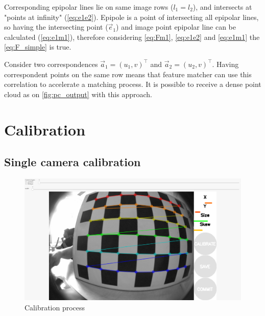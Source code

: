 Corresponding epipolar lines lie on same image rows ($l_1 = l_2$), and intersects at "points at infinity" (\autoref{eq:e1e2}). 
Epipole is a point of intersecting all epipolar lines, so having the intersecting point ($\vec{e}_1$) and image point epipolar line can be calculated (\autoref{eq:e1m1}), therefore considering \autoref{eq:Fm1}, \autoref{eq:e1e2} and \autoref{eq:e1m1} the \autoref{eq:F_simple} is true.

Consider two correspondences $\vec{a}_1 = (u_1, v)^\top$ and $\vec{a}_2 = (u_2, v)^\top $. 
Having correspondent points on the same row means that feature matcher can use this correlation to accelerate a matching process.
It is possible to receive a dense point cloud as on \autoref{fig:pc_output} with this approach.

\section{Calibration}
\label{sec:prelimin_calibration}
\subsection{Single camera calibration}

\begin{figure}[h]
    \centering
    \includegraphics[width=.6\textwidth]{graphics/calibration.png}
    \caption{Calibration process}
    \label{fig:calib}
\end{figure}

